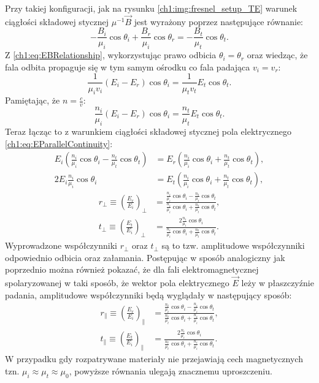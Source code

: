 Przy takiej konfiguracji, jak na rysunku \ref{ch1:img:fresnel_setup_TE} warunek ciągłości składowej stycznej $\mu^{-1}\vec{B}$ jest wyrażony poprzez następujące równanie:
\begin{equation}
-\frac{B_i}{\mu_i}\cos\theta_i + \frac{B_r}{\mu_i}\cos\theta_r = -\frac{B_t}{\mu_t}\cos\theta_t.
\end{equation}
Z \eqref{ch1:eq:EBRelationship}, wykorzystując prawo odbicia $\theta_i = \theta_r$ oraz wiedząc, że fala odbita propaguje się w tym samym ośrodku co fala padająca $v_i = v_r$:
\begin{equation}
\frac{1}{\mu_iv_i}\left( E_i - E_r \right)\cos\theta_i = \frac{1}{\mu_tv_t}E_t\cos\theta_t.
\end{equation}
Pamiętając, że $n = \frac{c}{v}$:
\begin{equation}
\frac{n_i}{\mu_i}\left(E_i - E_r \right)\cos\theta_i = \frac{n_t}{\mu_t}E_t\cos\theta_t.
\end{equation}
Teraz łącząc to z warunkiem ciągłości składowej stycznej pola elektrycznego \eqref{ch1:eq:EParallelContinuity}:
\begin{align}
E_i\left( \frac{n_i}{\mu_i}\cos\theta_i - \frac{n_t}{\mu_t}\cos\theta_t \right) &= E_r\left( \frac{n_i}{\mu_i}\cos\theta_i + \frac{n_t}{\mu_t}\cos\theta_t \right),\\
2E_i\frac{n_i}{\mu_i}\cos\theta_i &= E_t\left( \frac{n_i}{\mu_i}\cos\theta_i + \frac{n_t}{\mu_t}\cos\theta_t \right),
\end{align}
\begin{align}
\label{ch1:eq:rPerpendicularGeneral}
r_\perp\equiv \left(\frac{E_r}{E_i}\right)_\perp &= \frac{\frac{n_i}{\mu_i}\cos\theta_i - \frac{n_t}{\mu_t}\cos\theta_t}{\frac{n_i}{\mu_i}\cos\theta_i + \frac{n_t}{\mu_t}\cos\theta_t},\\
t_\perp\equiv \left(\frac{E_t}{E_i}\right)_\perp &= \frac{2\frac{n_i}{\mu_i}\cos\theta_i}{\frac{n_i}{\mu_i}\cos\theta_i + \frac{n_t}{\mu_t}\cos\theta_t}.
\end{align}
Wyprowadzone współczynniki $r_\perp$ oraz $t_\perp$ są to tzw. amplitudowe współczynniki odpowiednio odbicia oraz załamania.
Postępując w sposób analogiczny jak poprzednio można również pokazać, że dla fali elektromagnetycznej spolaryzowanej w taki sposób, że wektor pola elektrycznego $\vec{E}$ leży w płaszczyźnie padania, amplitudowe współczynniki będą wyglądały w następujący sposób:
\begin{align}
\label{ch1:eq:rParallelGeneral}
r_\parallel\equiv \left(\frac{E_r}{E_i}\right)_\parallel &= \frac{\frac{n_t}{\mu_t}\cos\theta_i - \frac{n_i}{\mu_i}\cos\theta_t}{\frac{n_t}{\mu_t}\cos\theta_i + \frac{n_i}{\mu_i}\cos\theta_t},\\
t_\parallel\equiv \left(\frac{E_t}{E_i}\right)_\parallel &= \frac{2\frac{n_i}{\mu_i}\cos\theta_i}{\frac{n_t}{\mu_t}\cos\theta_i + \frac{n_i}{\mu_i}\cos\theta_t}.
\end{align}
W przypadku gdy rozpatrywane materiały nie przejawiają cech magnetycznych tzn. $\mu_i \approx \mu_t \approx \mu_0$, powyższe równania ulegają znacznemu uproszczeniu.

